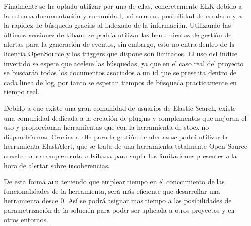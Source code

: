 Finalmente se ha optado utilizar por una de ellas, concretamente ELK debido a la extensa documentación y comunidad, así como su posibilidad de escalado y a la rapidez de búsqueda gracias al indexado de la información. Utilizando las últimas versiones de kibana se podría utilizar las herramientas de gestión de alertas para la generación de eventos, sin embargo, esto no entra dentro de la licencia OpenSource y los triggers que dispone son limitados. El uso del índice invertido se espere que acelere las búsquedas, ya que en el caso real del proyecto se buscarán todas los documentos asociados a un id que se presenta dentro de cada línea de log, por tanto se esperan tiempos de búsqueda practicamente en tiempo real.

Debido a que existe una gran comunidad de usuarios de Elastic Search, existe una comunidad dedicada a la creación de plugins y complementos que mejoran el uso y proporcionan herramientas que con la herramienta de stock no dispondríamos. Gracias a ello para la gestión de alertas se podrá utilizar la herramienta ElastAlert, que se trata de una herramienta totalmente Open Source creada como complemento a Kibana para suplir las limitaciones presentes a la hora de alertar sobre incoherencias.

De esta forma aun teniendo que emplear tiempo en el conocimiento de las funcionalidades de la herramienta, será más eficiente que desarrollar una herramienta desde 0. Así se podrá asignar mas tiempo a las posibilidades de parametrización de la solución para poder ser aplicada a otros proyectos y en otros entornos.